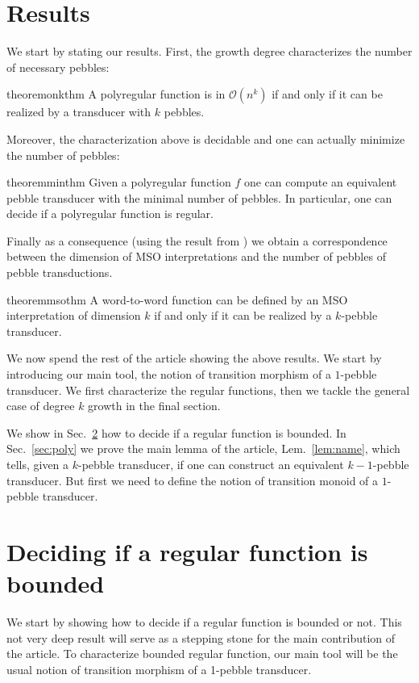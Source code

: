 \documentclass{article}
\newcommand{\Oo}{\mathcal O}
\newcommand{\mso}{\textsf{MSO}\xspace}
\theoremstyle{definition}
\theoremstyle{remark}
\begin{document}
\section{Results}
\label{sec:results}
We start by stating our results. First, the growth degree characterizes the number of necessary pebbles:
\begin{restatable}[Characterization]{theorem}{onkthm}
    \label{thm:onk}
    A polyregular function is in $\Oo(n^k)$ if and only if it can be realized by a transducer with $k$ pebbles.
\end{restatable}
Moreover, the characterization above is decidable and one can actually minimize the number of pebbles:
\begin{restatable}[Minimization]{theorem}{minthm}
    \label{thm:min}
    Given a polyregular function $f$ one can compute an equivalent pebble transducer with the minimal number of pebbles. In particular, one can decide if a polyregular function is regular.
\end{restatable}
Finally as a consequence (using the result from \cite[Thm.~7]{BojanczykKL19}) we obtain a correspondence between the dimension of \mso interpretations and the number of pebbles of pebble transductions.
\begin{restatable}[\mso-dimension]{theorem}{msothm}
    \label{thm:mso}
    A word-to-word function can be defined by an \mso interpretation of dimension $k$ if and only if it can be realized by a $k$-pebble transducer.
\end{restatable}
We now spend the rest of the article showing the above results. We start by introducing our main tool, the notion of transition morphism of a $1$-pebble transducer. We first characterize the regular functions, then we tackle the general case of degree $k$ growth in the final section.

We show in Sec.~\ref{sec:reg} how to decide if a regular function is bounded.  In Sec.~\ref{sec:poly} we prove the main lemma of the article, Lem.~\ref{lem:name}, which tells, given a $k$-pebble transducer, if one can construct an equivalent $k-1$-pebble transducer.
But first we need to define the notion of transition monoid of a $1$-pebble transducer.


\section{Deciding if a regular function is bounded}
\label{sec:reg}
We start by showing how to decide if a regular function is bounded or not. This not very deep result will serve as a stepping stone for the main contribution of the article.
To characterize bounded regular function, our main tool will be the usual notion of transition morphism of a 1-pebble transducer.
\end{document}
